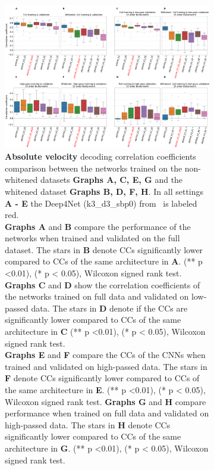 \begin{figure}[!htbp]\ContinuedFloat
\begin{subfigure}[b]{\textwidth}
   \includegraphics[width=1\linewidth]{img/ch4/absVel-pw-vs-non-pw-performance}
   \caption{\textbf{Absolute velocity} decoding correlation coefficients comparison between the networks trained on the non-whitened datasets \textbf{Graphs A, C, E, G} and the whitened dataset \textbf{Graphs B, D, F, H}.
   In all settings \textbf{A - E} the Deep4Net (k3\_d3\_sbp0) from~\cite{Hammer-2021} is labeled red.
   \\ \textbf{Graphs A} and \textbf{B} compare the performance of the networks when trained and validated on the full dataset.
   The stars in \textbf{B} denote CCs significantly lower compared to CCs of the same architecture in \textbf{A}. (** p <0.01), (* p < 0.05), Wilcoxon signed rank test.
   \\\textbf{Graphs C} and \textbf{D} show the correlation coefficients of the networks trained on full data and validated on low-passed data.
   The stars in \textbf{D} denote if the CCs are significantly lower compared to CCs of the same architecture in \textbf{C} (** p <0.01), (* p < 0.05), Wilcoxon signed rank test.
   \\\textbf{Graphs E} and \textbf{F} compare the CCs of the CNNs when trained and validated on high-passed data.
   The stars in \textbf{F} denote CCs significantly lower compared to CCs of the same architecture in \textbf{E}. (** p <0.01), (* p < 0.05), Wilcoxon signed rank test.
   \textbf{Graphs G} and \textbf{H} compare performance when trained on full data and validated on high-passed data.
   The stars in \textbf{H} denote CCs significantly lower compared to CCs of the same architecture in \textbf{G}. (** p <0.01), (* p < 0.05), Wilcoxon signed rank test.}
   \label{fig:absVel-pw-performance}
\end{subfigure}
\caption[Spectral whitening - performance comparison]{}
\label{fig:pw-performance}
\end{figure}

